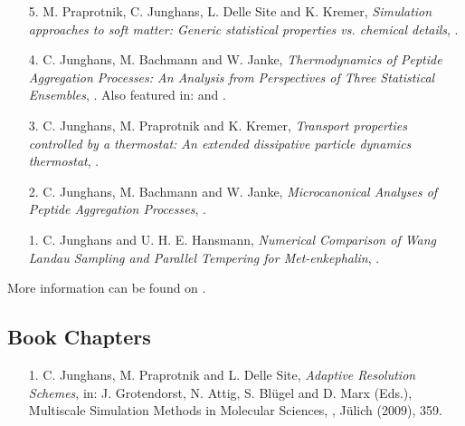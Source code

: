 \documentclass{article}
\begin{document}
\begin{enumerate}
\item[5.] M. Praprotnik, C. Junghans, L. Delle Site and K. Kremer,
  \textit{Simulation approaches to soft matter: Generic statistical properties vs. chemical details},
  .

\item[4.] C. Junghans, M. Bachmann and W. Janke,
  \textit{Thermodynamics of Peptide Aggregation Processes: An Analysis from Perspectives of Three Statistical Ensembles},
   .
  Also featured in:  and .

\item[3.] C. Junghans, M. Praprotnik and K. Kremer,
  \textit{Transport properties controlled by a thermostat: An extended dissipative particle dynamics thermostat},
  .

\item[2.] C. Junghans, M. Bachmann and W. Janke,
  \textit{Microcanonical Analyses of Peptide Aggregation Processes},
  .

\item[1.] C. Junghans and U. H. E. Hansmann,
  \textit{Numerical Comparison of Wang Landau Sampling and Parallel Tempering for Met-enkephalin}, 
  .
\end{enumerate}

More information can be found on .

\subsection*{Book Chapters}

\begin{enumerate}
\item[1.] C. Junghans, M. Praprotnik and L. Delle Site,
  \textit{Adaptive Resolution Schemes},
  in: J. Grotendorst, N. Attig, S. Bl{\"u}gel and D. Marx (Eds.),
  Multiscale Simulation Methods in Molecular Sciences, , J{\"u}lich (2009), 359.
\end{enumerate}
\end{document}
